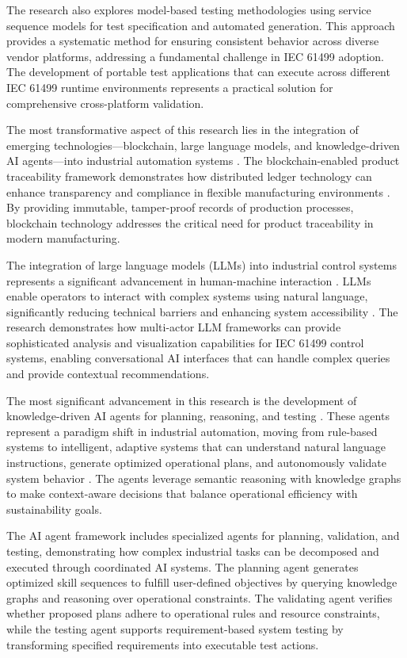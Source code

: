 The research also explores model-based testing methodologies using service sequence models for test specification and automated generation. This approach provides a systematic method for ensuring consistent behavior across diverse vendor platforms, addressing a fundamental challenge in IEC 61499 adoption. The development of portable test applications that can execute across different IEC 61499 runtime environments represents a practical solution for comprehensive cross-platform validation.

The most transformative aspect of this research lies in the integration of emerging technologies—blockchain, large language models, and knowledge-driven AI agents—into industrial automation systems \cite{wang2019blockchain}. The blockchain-enabled product traceability framework demonstrates how distributed ledger technology can enhance transparency and compliance in flexible manufacturing environments \cite{liang2019secure}. By providing immutable, tamper-proof records of production processes, blockchain technology addresses the critical need for product traceability in modern manufacturing.

The integration of large language models (LLMs) into industrial control systems represents a significant advancement in human-machine interaction \cite{chang2024survey}. LLMs enable operators to interact with complex systems using natural language, significantly reducing technical barriers and enhancing system accessibility \cite{wei2022emergent}. The research demonstrates how multi-actor LLM frameworks can provide sophisticated analysis and visualization capabilities for IEC 61499 control systems, enabling conversational AI interfaces that can handle complex queries and provide contextual recommendations.

The most significant advancement in this research is the development of knowledge-driven AI agents for planning, reasoning, and testing \cite{wang2024survey}. These agents represent a paradigm shift in industrial automation, moving from rule-based systems to intelligent, adaptive systems that can understand natural language instructions, generate optimized operational plans, and autonomously validate system behavior \cite{LEITAO2009979}. The agents leverage semantic reasoning with knowledge graphs to make context-aware decisions that balance operational efficiency with sustainability goals.

The AI agent framework includes specialized agents for planning, validation, and testing, demonstrating how complex industrial tasks can be decomposed and executed through coordinated AI systems. The planning agent generates optimized skill sequences to fulfill user-defined objectives by querying knowledge graphs and reasoning over operational constraints. The validating agent verifies whether proposed plans adhere to operational rules and resource constraints, while the testing agent supports requirement-based system testing by transforming specified requirements into executable test actions.

